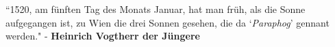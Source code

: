 \documentclass[11pt]{article}
\begin{document}
\begingroup
\begin{center}
``1520, am fünften Tag des Monats Januar, hat man früh, als die Sonne aufgegangen ist, zu Wien die drei Sonnen gesehen, die da `\textit{Paraphog}' gennant werden."
\rightskip\leftskip
\phantom{text} \hfill - \textbf{Heinrich Vogtherr der Jüngere}
\end{center}
\endgroup

\vspace*{0.1\baselineskip}
\end{document}
